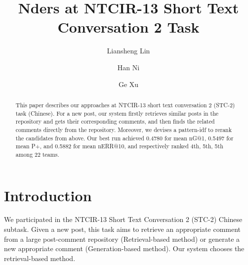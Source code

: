 \documentclass{llncs}
\begin{document}
%
%


%
%
\title{Nders at NTCIR-13 Short Text Conversation 2 Task}
%
\titlerunning{}  %
%
\author{Liansheng Lin \and Han Ni \and Ge Xu}
%
%
%

\maketitle              %

\begin{abstract}
This paper describes our approaches at NTCIR-13 short text conversation 2 
(STC-2) task (Chinese). For a new post, our system firstly retrieves similar posts 
in the repository and gets their corresponding comments, and then finds the 
related comments directly from the repository. Moreover, we devises a pattern-idf to rerank the candidates from above. Our best run achieved 0.4780 for mean nG@1, 0.5497 for mean P+, 
and 0.5882 for mean nERR@10, and respectively ranked 4th, 5th, 5th among 22 
teams. 
\end{abstract}

\section{Introduction}
We participated in the NTCIR-13 Short Text Conversation 2 (STC-2) Chinese 
subtask. Given a new post, this task aims to retrieve an appropriate comment 
from a large post-comment repository (Retrieval-based method) or generate a new 
appropriate comment (Generation-based method). Our system chooses the 
retrieval-based method. 
\end{document}
